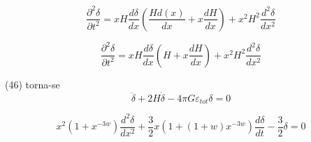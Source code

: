\documentclass[a4paper,12pt]{article}
\begin{document}
$$\dfrac{\partial^2 \delta}{\partial t^2} = xH\dfrac{d \delta}{d x }\left( \dfrac{Hd(x) }{dx } + x\dfrac{dH }{dx }\right) + x^2H^2 \dfrac{d^2 \delta}{d x^2 }$$

$$\dfrac{\partial^2 \delta}{\partial t^2} = xH\dfrac{d \delta}{d x }\left( H + x\dfrac{dH }{dx }\right) + x^2H^2 \dfrac{d^2 \delta}{d x^2 }$$

(46) torna-se
$$\ddot{\delta} + 2H\dot{\delta}  -4\pi G\varepsilon_{tot}\delta = 0$$


\begin{equation}
	x^2 (1+x^{-3w})\dfrac{d^2\delta}{dx^2} + \dfrac{3}{2}x(1+ (1+w)x^{-3w})\dfrac{d\delta}{dt} - \dfrac{3}{2}\delta = 0
\end{equation}
\end{document}
